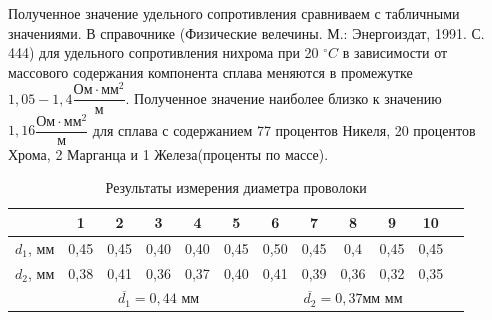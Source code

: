 \documentclass[a4paper, 10pt]{article}%
\begin{document}
Полученное значение удельного сопротивления сравниваем с табличными значениями. В справочнике (Физические велечины. М.: Энергоиздат, 1991. С. 444) для удельного сопротивления нихрома при 20 $ ^\circ C$ в зависимости от массового содержания компонента сплава меняются в промежутке  $1,05 - 1,4\dfrac{\text{Ом} \cdot \text{мм}^2}{\text{м}}$. Полученное значение наиболее близко к значению  $1,16\dfrac{\text{Ом} \cdot \text{мм}^2}{\text{м}}$ для сплава с содержанием 77 процентов Никеля, 20 процентов Хрома, 2 Марганца и 1 Железа(проценты по массе).
\newpage
\begin{table}
	\caption{Результаты измерения диаметра проволоки}
	\begin{tabular}{|r|c|c|c|c|c|c|c|c|c|c|c|}
	\hline
& 1 & 2 & 3 & 4 & 5 & 6 & 7 & 8 & 9 & 10\\
\hline
$d_1$, мм & 0,45 & 0,45 & 0,40 & 0,40 & 0,45 & 0,50 & 0,45 & 0,4 & 0,45 & 0,45 \\
\hline
$d_2$, мм & 0,38 & 0,41 & 0,36 & 0,37 & 0,40 & 0,41 & 0,39 & 0,36 & 0,32 & 0,35 \\
\hline
\multicolumn{1}{|r|}{} & \multicolumn{5}{c}{ \( \overline{d_{1}} =  0,44\) мм}  & \multicolumn{5}{c|}{ \( \overline{d_{2}} = 0,37 мм \) мм}\\
\hline
\end{tabular}
\end{table}
\end{document}
